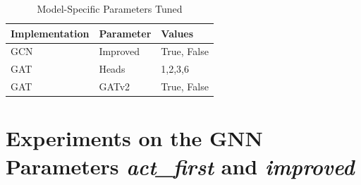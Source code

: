 \begin{table}
	\begin{tabular}{|l|l|l|}
		\hline
		\textbf{Implementation} & \textbf{Parameter} & \textbf{Values} \\
		\hline
		GCN & Improved & {True, False} \\
		\hline 
		GAT & Heads & {1,2,3,6} \\
		\hline
		GAT & GATv2 & {True, False} \\
		\hline
	\end{tabular}
	\caption{Model-Specific Parameters Tuned}
\end{table}

\section{Experiments on the \ac{GNN} Parameters \textit{act\_first} and \textit{improved}}

